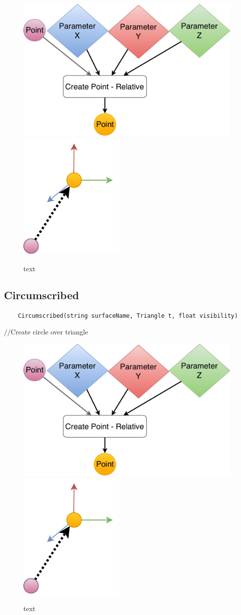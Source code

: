 \begin{figure}[H]
	\centering
	\includegraphics[height=0.3\textwidth]{obrazky-figures/Diagram/DP Navrh operacii-0D - Point2.pdf}
	\includegraphics[height=0.3\textwidth]{obrazky-figures/Diagram/Draw/1Points/DP Navrh operacii-0D - PointRelative.pdf}
	\caption{text}
	\label{fig:1}
\end{figure}



\subsection{Circumscribed}
\begin{lstlisting}
	Circumscribed(string surfaceName, Triangle t, float visibility)
\end{lstlisting} //Create circle over triangle

\begin{figure}[H]
	\centering
	\includegraphics[height=0.3\textwidth]{obrazky-figures/Diagram/DP Navrh operacii-0D - Point2.pdf}
	\includegraphics[height=0.3\textwidth]{obrazky-figures/Diagram/Draw/1Points/DP Navrh operacii-0D - PointRelative.pdf}
	\caption{text}
	\label{fig:1}
\end{figure}

